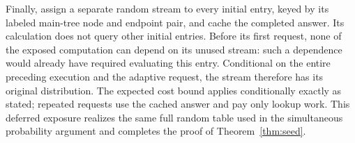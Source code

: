 Finally, assign a separate random stream to every initial entry, keyed by
its labeled main-tree node and endpoint pair, and cache the completed
answer.  Its calculation does not query other initial entries.  Before its
first request, none of the exposed computation can depend on its unused
stream: such a dependence would already have required evaluating this
entry.  Conditional on the entire preceding execution and the adaptive
request, the stream therefore has its original distribution.  The expected
cost bound applies conditionally exactly as stated; repeated requests use
the cached answer and pay only lookup work.  This deferred exposure realizes
the same full random table used in the simultaneous probability argument
and completes the proof of Theorem~\ref{thm:seed}.
